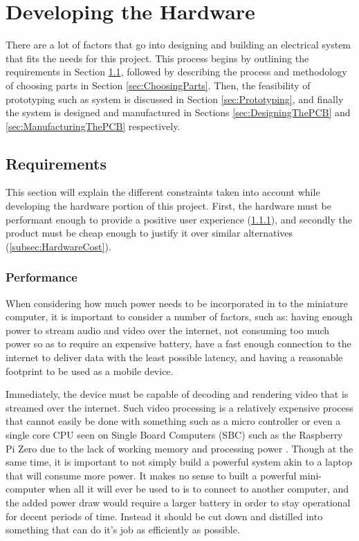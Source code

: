 \chapter{Developing the Hardware}

\label{Chapter4}

There are a lot of factors that go into designing and building an electrical system that fits the needs for this project.
This process begins by outlining the requirements in Section \ref{sec:HardwareRequirements}, followed by describing the process and methodology of choosing parts in Section \ref{sec:ChoosingParts}.
Then, the feasibility of prototyping such as system is discussed in Section \ref{sec:Prototyping}, and finally the system is designed and manufactured in Sections \ref{sec:DesigningThePCB} and \ref{sec:ManufacturingThePCB} respectively.

\section{Requirements}\label{sec:HardwareRequirements}

This section will explain the different constraints taken into account while developing the hardware portion of this project.
First, the hardware must be performant enough to provide a positive user experience (\ref{subsec:HardwarePerformance}), and secondly the product must be cheap enough to justify it over similar alternatives (\ref{subsec:HardwareCost}).

\subsection{Performance}\label{subsec:HardwarePerformance}

When considering how much power needs to be incorporated in to the miniature computer, it is important to consider a number of factors, such as: having enough power to stream audio and video over the internet, not consuming too much power so as to require an expensive battery, have a fast enough connection to the internet to deliver data with the least possible latency, and having a reasonable footprint to be used as a mobile device.

Immediately, the device must be capable of decoding and rendering video that is streamed over the internet.
Such video processing is a relatively expensive process that cannot easily be done with something such as a micro controller or even a single core CPU seen on Single Board Computers (SBC) such as the Raspberry Pi Zero due to the lack of working memory and processing power \cite{picockpit_2021}.
Though at the same time, it is important to not simply build a powerful system akin to a laptop that will consume more power.
It makes no sense to built a powerful mini-computer when all it will ever be used to is to connect to another computer, and the added power draw would require a larger battery in order to stay operational for decent periods of time.
Instead it should be cut down and distilled into something that can do it's job as efficiently as possible.

